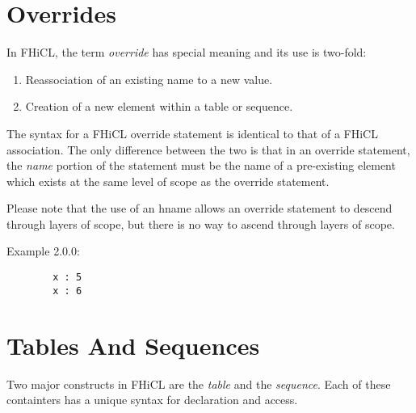 \documentclass{article}
\begin{document}
\section{Overrides}
	In FHiCL, the term \emph{override} has special meaning and its use is two-fold:
	\begin{enumerate}
		\item Reassociation of an existing name to a new value.
		\item Creation of a new element within a table or sequence.
	\end{enumerate}
	\par
	The syntax for a FHiCL override statement is identical to that of a FHiCL association.
	The only difference between the two is that in an override statement,
	the \emph{name} portion of the statement must be the name of a pre-existing element
	which exists at the same level of scope as the override statement.
	\par
	Please note that the use of an hname allows an override statement to descend through layers of scope,
	but there is no way to ascend through layers of scope.
	\par
	Example 2.0.0:
	\begin{verbatim}
		x : 5
		x : 6
	\end{verbatim}
\section{Tables And Sequences}
	Two major constructs in FHiCL are the \emph{table} and the \emph{sequence}.
	Each of these containters has a unique syntax for declaration and access.
\end{document}
